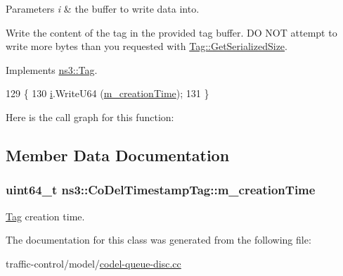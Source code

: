 \begin{DoxyParams}{Parameters}
{\em i} & the buffer to write data into.\\
\hline
\end{DoxyParams}
Write the content of the tag in the provided tag buffer. DO N\+OT attempt to write more bytes than you requested with \hyperlink{classns3_1_1Tag_a01c8efdea943fd8cce2ef5d4d67eefa6}{Tag\+::\+Get\+Serialized\+Size}. 

Implements \hyperlink{classns3_1_1Tag_ac9aa7c4f923da5d2c82de94690101dc3}{ns3\+::\+Tag}.


\begin{DoxyCode}
129 \{
130   \hyperlink{bernuolliDistribution_8m_a6f6ccfcf58b31cb6412107d9d5281426}{i}.WriteU64 (\hyperlink{classns3_1_1CoDelTimestampTag_a8af6666a443c5c1bf974c55d9540a5cf}{m\_creationTime});
131 \}
\end{DoxyCode}


Here is the call graph for this function\+:




\subsection{Member Data Documentation}
\subsubsection[{\texorpdfstring{m\+\_\+creation\+Time}{m_creationTime}}]{\setlength{\rightskip}{0pt plus 5cm}uint64\+\_\+t ns3\+::\+Co\+Del\+Timestamp\+Tag\+::m\+\_\+creation\+Time\hspace{0.3cm}{\ttfamily [private]}}\hypertarget{classns3_1_1CoDelTimestampTag_a8af6666a443c5c1bf974c55d9540a5cf}{}\label{classns3_1_1CoDelTimestampTag_a8af6666a443c5c1bf974c55d9540a5cf}


\hyperlink{classns3_1_1Tag}{Tag} creation time. 



The documentation for this class was generated from the following file\+:\begin{DoxyCompactItemize}
\item 
traffic-\/control/model/\hyperlink{codel-queue-disc_8cc}{codel-\/queue-\/disc.\+cc}\end{DoxyCompactItemize}
